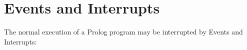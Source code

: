 %
% 
% 
% 
% 
%
%
%

\chapter{Events and Interrupts}
\label{chapexcept}

The normal execution of a Prolog program may be interrupted by
Events and Interrupts:

